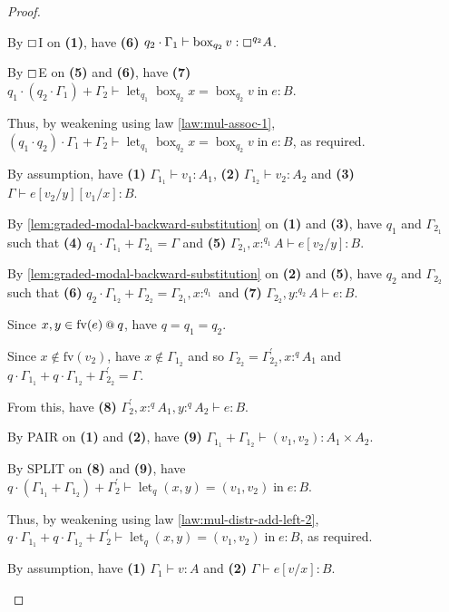\documentclass[acmsmall,screen,nonacm]{acmart}
\makeatletter
\DeclareMathOperator{\llet}{\text{let}}
\DeclareMathOperator{\lin}{\text{in}}
\DeclareMathOperator{\case}{\text{case}}
\DeclareMathOperator{\bbox}{\text{box}}
\newcommand{\at}{\mathbin{\mbox{\small\ensuremath{@}}}}
\DeclareMathOperator{\absurd}{\text{absurd}}
\newcommand{\tee}{\vdash}
\DeclareMathOperator{\red}{\rightsquigarrow}
\makeatother
\begin{document}
\begin{proof}
\begin{description}
    By $\boxempty$I on \textbf{(1)}, have \textbf{(6)} $q_2 \cdot \Gamma_1 \tee \bbox_{q_2} v : \boxempty^{q_2} A$.

    By $\boxempty$E on \textbf{(5)} and \textbf{(6)}, have \textbf{(7)} $q_1 \cdot (q_2 \cdot \Gamma_1) + \Gamma_2 \tee \llet_{q_1} \bbox_{q_2} x = \bbox_{q_2} v \lin e : B$.

    Thus, by weakening using law \ref{law:mul-assoc-1}, $(q_1 \cdot q_2) \cdot \Gamma_1 + \Gamma_2 \tee \llet_{q_1} \bbox_{q_2} x = \bbox_{q_2} v \lin e : B$, as required.
    \\
    \item[\mbox{Case $e[v_1/x, v_2/y] \red \llet_q (x, y) = (v_1, v_2) \lin e : A$}.]
    By assumption, have \textbf{(1)} $\Gamma_{1_1} \tee v_1 : A_1$, \textbf{(2)} $\Gamma_{1_2} \tee v_2 : A_2$ and \textbf{(3)} $\Gamma \tee e[v_2/y][v_1/x] : B$.

    By \ref{lem:graded-modal-backward-substitution} on \textbf{(1)} and \textbf{(3)}, have $q_1$ and $\Gamma_{2_1}$ such that \textbf{(4)} $q_1 \cdot \Gamma_{1_1} + \Gamma_{2_1} = \Gamma$ and \textbf{(5)} $\Gamma_{2_1}, x :^{q_1} A \tee e[v_2/y] : B$.

    By \ref{lem:graded-modal-backward-substitution} on \textbf{(2)} and \textbf{(5)}, have $q_2$ and $\Gamma_{2_2}$ such that \textbf{(6)} $q_2 \cdot \Gamma_{1_2} + \Gamma_{2_2} = \Gamma_{2_1}, x :^{q_1}$ and \textbf{(7)} $\Gamma_{2_2}, y :^{q_2} A \tee e : B$.

    Since $x, y \in \mathrm{fv}(e) \at q$, have $q = q_1 = q_2$.

    Since $x \notin \mathrm{fv}(v_2)$, have $x \notin \Gamma_{1_2}$ and so $\Gamma_{2_2} = \Gamma_{2_2}^\prime, x :^q A_1$ and $q \cdot \Gamma_{1_1} + q \cdot \Gamma_{1_2} + \Gamma_{2_2}^\prime = \Gamma$.

    From this, have \textbf{(8)} $\Gamma_2^\prime, x :^q A_1, y :^q A_2 \tee e : B$.

    By PAIR on \textbf{(1)} and \textbf{(2)}, have \textbf{(9)} $\Gamma_{1_1} + \Gamma_{1_2} \tee (v_1, v_2) : A_1 \times A_2$.

    By SPLIT on \textbf{(8)} and \textbf{(9)}, have $q \cdot (\Gamma_{1_1} + \Gamma_{1_2}) + \Gamma_2^\prime \tee \llet_q (x, y) = (v_1, v_2) \lin e : B$.

    Thus, by weakening using law \ref{law:mul-distr-add-left-2}, $q \cdot \Gamma_{1_1} + q \cdot \Gamma_{1_2} + \Gamma_2^\prime \tee \llet_q (x, y) = (v_1, v_2) \lin e : B$, as required.
    \\
    \item[\mbox{Case $e[v/x] \red \case_q v \{x.e; \, y.\absurd \, y\} : A$}.]
    By assumption, have \textbf{(1)} $\Gamma_1 \tee v : A$ and \textbf{(2)} $\Gamma \tee e[v/x] : B$.
    

\end{description}
\end{proof}
\end{document}
